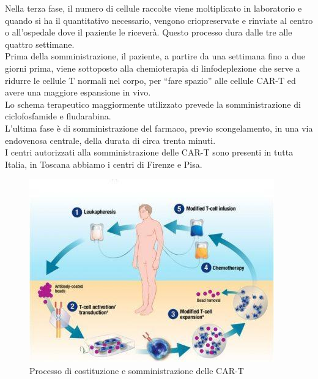 Nella terza fase, il numero di cellule raccolte viene moltiplicato in laboratorio e quando si ha il quantitativo 
necessario, vengono criopreservate e rinviate al centro o all’ospedale dove il paziente le riceverà. 
Questo processo dura dalle tre alle quattro settimane.\\
Prima della somministrazione, il paziente, a partire da una settimana fino a due giorni prima, viene sottoposto 
alla chemioterapia di linfodeplezione che  serve a ridurre le cellule T normali nel corpo, per “fare spazio” alle 
cellule CAR-T ed avere una maggiore espansione in vivo.\\ 
Lo schema terapeutico maggiormente utilizzato prevede la somministrazione di ciclofosfamide e fludarabina.\\

L’ultima fase è di somministrazione del farmaco, previo scongelamento, in una via endovenosa centrale, 
della durata di circa trenta minuti\cite{EMATOCART}.\\
I centri autorizzati alla somministrazione delle CAR-T sono presenti in tutta Italia, in Toscana abbiamo 
i centri di Firenze e Pisa\cite{AILCENTRI}.\\

\begin{figure}[H]
    \begin{center}
    \includegraphics[width=0.58\columnwidth]{img/car-tprocess.jpeg}
    \end{center}
    \caption{Processo di costituzione e somministrazione delle CAR-T
    \cite{EMATOCART}}

\end{figure}

